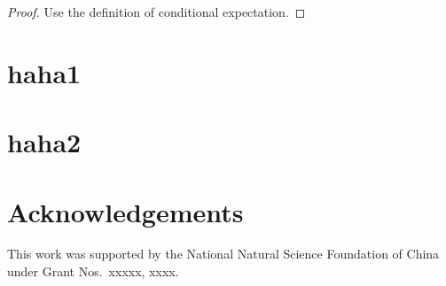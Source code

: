\documentclass[11pt]{article}
\theoremstyle{plain}
\theoremstyle{definition}
\theoremstyle{remark}
\begin{document}
\begin{proof}
 Use the definition of conditional expectation.
\end{proof}


\begin{appendices}
    \section{haha1}
    \section{haha2}
\end{appendices}
\section*{Acknowledgements}
This work was supported by the National Natural Science Foundation of China under Grant Nos.\ xxxxx, xxxx.





\end{document}
